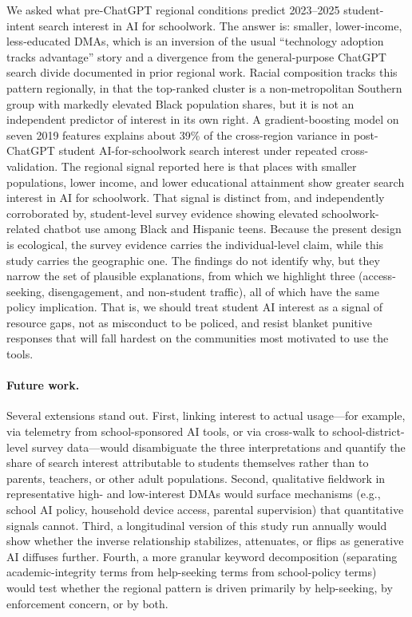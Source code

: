\documentclass[11pt]{article}
\begin{document}
We asked what pre-ChatGPT regional conditions predict 2023--2025 student-intent search interest in AI for schoolwork. The answer is: smaller, lower-income, less-educated DMAs, which is an inversion of the usual ``technology adoption tracks advantage'' story and a divergence from the general-purpose ChatGPT search divide documented in prior regional work. Racial composition tracks this pattern regionally, in that the top-ranked cluster is a non-metropolitan Southern group with markedly elevated Black population shares, but it is not an independent predictor of interest in its own right. A gradient-boosting model on seven 2019 features explains about 39\% of the cross-region variance in post-ChatGPT student AI-for-schoolwork search interest under repeated cross-validation. The regional signal reported here is that places with smaller populations, lower income, and lower educational attainment show greater search interest in AI for schoolwork. That signal is distinct from, and independently corroborated by, student-level survey evidence showing elevated schoolwork-related chatbot use among Black and Hispanic teens. Because the present design is ecological, the survey evidence carries the individual-level claim, while this study carries the geographic one. The findings do not identify why, but they narrow the set of plausible explanations, from which we highlight three (access-seeking, disengagement, and non-student traffic), all of which have the same policy implication. That is, we should treat student AI interest as a signal of resource gaps, not as misconduct to be policed, and resist blanket punitive responses that will fall hardest on the communities most motivated to use the tools.

\paragraph{Future work.} Several extensions stand out. First, linking interest to actual usage---for example, via telemetry from school-sponsored AI tools, or via cross-walk to school-district-level survey data---would disambiguate the three interpretations and quantify the share of search interest attributable to students themselves rather than to parents, teachers, or other adult populations. Second, qualitative fieldwork in representative high- and low-interest DMAs would surface mechanisms (e.g., school AI policy, household device access, parental supervision) that quantitative signals cannot. Third, a longitudinal version of this study run annually would show whether the inverse relationship stabilizes, attenuates, or flips as generative AI diffuses further. Fourth, a more granular keyword decomposition (separating academic-integrity terms from help-seeking terms from school-policy terms) would test whether the regional pattern is driven primarily by help-seeking, by enforcement concern, or by both.
\end{document}
